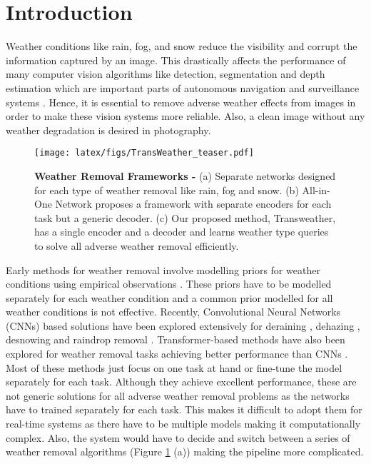 \documentclass[10pt,twocolumn,letterpaper]{article}
\begin{document}
\section{Introduction}
\label{sec:intro}
\setlength{\belowdisplayskip}{0pt} \setlength{\belowdisplayshortskip}{0pt}
\setlength{\abovedisplayskip}{0pt} \setlength{\abovedisplayshortskip}{0pt}
Weather conditions like rain, fog, and snow reduce the visibility and corrupt the information captured by an image. This drastically affects the performance of many computer vision algorithms like detection, segmentation and depth estimation \cite{ren2015faster, carion2020end, xie2021segformer, wang2020sdc, chen2018encoder } which are important parts of autonomous navigation and surveillance systems \cite{liang2018deep,perera2018uav,qi2018frustum,prakash2021multi}. Hence, it is essential to remove adverse weather effects
from images in order to make these vision systems more reliable. Also, a clean image without any weather degradation is desired in  photography.
\begin{figure}[!]
	\centering
	\texttt{[image: latex/figs/TransWeather\_teaser.pdf]}
	\caption{\textbf{Weather Removal Frameworks -} (a) Separate networks designed for each type of weather removal like rain, fog and snow. (b) All-in-One Network \cite{li2020all} proposes a framework with separate encoders for each task but a generic decoder. (c) Our proposed method, Transweather, has a single encoder and a decoder and learns weather type queries to solve all adverse weather removal efficiently. }
	\label{teaser}
\end{figure}
Early methods for weather removal involve modelling priors for weather conditions using empirical observations \cite{he2010single, roth2005fields, rudin1992nonlinear}. These priors have to be modelled separately for each weather condition and a common prior modelled for all weather conditions is not effective. Recently, Convolutional Neural Networks (CNNs) based solutions have been explored extensively for deraining \cite{zhang2018density,zhu2017joint,zhang2019image,yang2019joint,yasarla2019uncertainty,wei2019semi,wang2019spatial,qian2018attentive,fu2017removing}, dehazing \cite{ren2015faster,wu2021contrastive, dong2020multi, li2020deep, zhang2018density, zhang2019joint, zhang2021hierarchical}, desnowing \cite{liu2018desnownet, ren2017video, zhang2021deep} and raindrop removal \cite{qian2018attentive, quan2019deep, you2015adherent}. Transformer-based methods have also been explored for weather removal tasks achieving better performance than CNNs \cite{tan2021sdnet,qin2021etdnet,zhao2021hybrid}. Most of these methods just focus on one task at hand or fine-tune the model separately for each task. Although they achieve excellent performance, these are not generic solutions for all adverse weather removal problems as the networks have to trained separately for each task. This makes it difficult to adopt them for real-time systems as there have to be multiple models making it computationally complex. Also, the system would have to decide and switch between a series of weather removal algorithms (Figure \ref{teaser} (a)) making the pipeline more complicated. 
\end{document}

